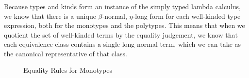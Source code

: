 Because types and kinds form an instance of the simply typed lambda
calculus, we know that there is a unique $\beta$-normal, $\eta$-long
form for each well-kinded type expression, both for the monotypes and
the polytypes. This means that when we quotient the set of well-kinded
terms by the equality judgement, we know that each equivalence class
contains a single long normal term, which we can take as the canonical
representative of that class.


\begin{figure}
\caption{Equality Rules for Monotypes}
\label{monotype-equality}
\end{figure}


